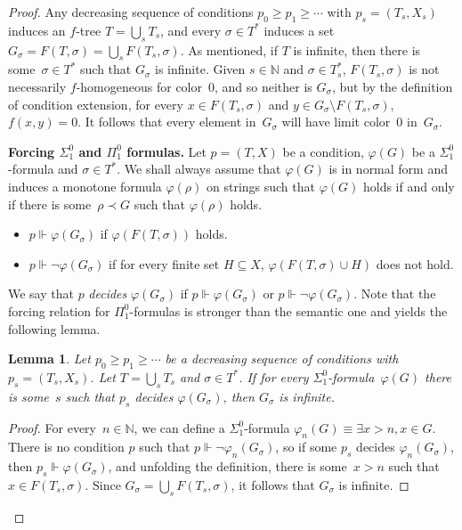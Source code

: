 \documentclass{article}
\newcommand{\NN}[0]{\mathbb{N}}
\numberwithin{theorem}{section}
\newtheorem{lemma}[theorem]{Lemma}
\begin{document}
\begin{proof}
Any decreasing sequence of conditions $p_0 \geq p_1 \geq \cdots$ with $p_s = (T_s, X_s)$ induces an $f$-tree $T = \bigcup_s T_s$, and every $\sigma \in T^*$ induces a set $G_\sigma = F(T, \sigma) = \bigcup_s F(T_s, \sigma)$. As mentioned, if $T$ is infinite, then there is some~$\sigma \in T^*$ such that $G_\sigma$ is infinite.
Given $s \in \NN$ and $\sigma \in T_s^*$, $F(T_s, \sigma)$ is not necessarily $f$-homogeneous for color~0, and so neither is $G_\sigma$, but by the definition of condition extension, for every $x \in F(T_s, \sigma)$ and $y \in G_\sigma \setminus F(T_s, \sigma)$, $f(x, y) = 0$. It follows that every element in~$G_\sigma$ will have limit color~0 in~$G_\sigma$.
\bigskip

\noindent
\textbf{Forcing $\Sigma^0_1$ and $\Pi^0_1$ formulas.}
Let $p = (T, X)$ be a condition, $\varphi(G)$ be a $\Sigma^0_1$-formula and $\sigma \in T^*$. We shall always assume that $\varphi(G)$ is in normal form and induces a monotone formula $\varphi(\rho)$ on strings such that $\varphi(G)$ holds if and only if there is some~$\rho \prec G$ such that $\varphi(\rho)$ holds.
\begin{itemize}
    \item[(1)] $p \Vdash \varphi(G_\sigma)$ if $\varphi(F(T, \sigma))$ holds.
    \item[(2)] $p \Vdash \neg \varphi(G_\sigma)$ if for every finite set $H \subseteq X$, $\varphi(F(T, \sigma) \cup H)$ does not hold.
\end{itemize}
We say that $p$ \emph{decides} $\varphi(G_\sigma)$ if $p \Vdash \varphi(G_\sigma)$ or $p \Vdash \neg\varphi(G_\sigma)$. Note that the forcing relation for $\Pi^0_1$-formulas is stronger than the semantic one and yields the following lemma.

\begin{lemma}
Let $p_0 \geq p_1 \geq \cdots$ be a decreasing sequence of conditions with $p_s = (T_s, X_s)$.
Let $T = \bigcup_s T_s$ and $\sigma \in T^*$. If for every $\Sigma^0_1$-formula~$\varphi(G)$ there is some~$s$ such that $p_s$ decides $\varphi(G_\sigma)$, then $G_\sigma$ is infinite.
\end{lemma}
\begin{proof}
For every~$n \in \NN$, we can define a $\Sigma^0_1$-formula $\varphi_n(G) \equiv \exists x > n, x \in G$. There is no condition $p$ such that $p \Vdash \neg \varphi_n(G_\sigma)$, so if some $p_s$ decides $\varphi_n(G_\sigma)$, then $p_s \Vdash \varphi(G_\sigma)$, and unfolding the definition, there is some~$x > n$ such that $x \in F(T_s, \sigma)$.
Since $G_\sigma = \bigcup_s F(T_s, \sigma)$, it follows that $G_\sigma$ is infinite.
\end{proof}
\bigskip


\end{proof}
\end{document}
